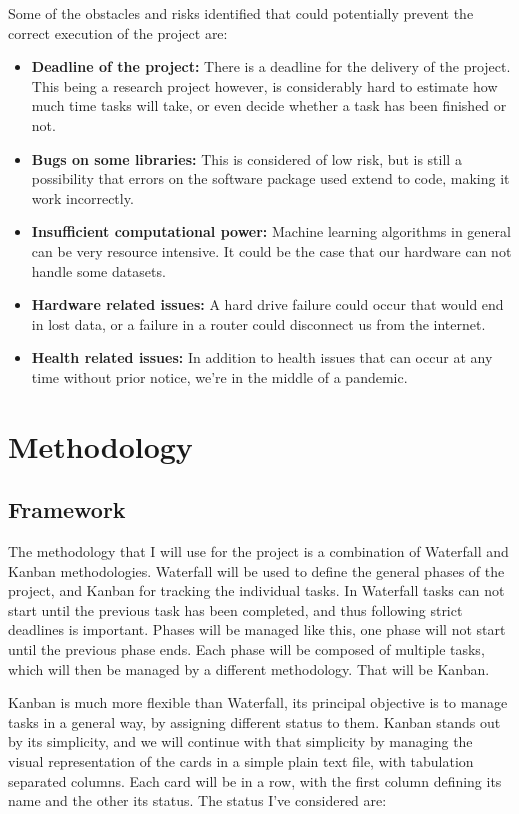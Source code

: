 Some of the obstacles and risks identified that could potentially prevent the correct execution of the project are:

\begin{itemize}
    \item \textbf{Deadline of the project:} There is a deadline for the delivery of the project. This being a research project however, is considerably hard to estimate how much time tasks will take, or even decide whether a task has been finished or not.
    \item \textbf{Bugs on some libraries:} This is considered of low risk, but is still a possibility that errors on the software package used extend to code, making it work in\-correctly.
    \item \textbf{Insufficient computational power:} Machine learning algorithms in general can be very resource intensive. It could be the case that our hardware can not handle some datasets. 
    \item \textbf{Hardware related issues:} A hard drive failure could occur that would end in lost data, or a failure in a router could disconnect us from the internet.
    \item \textbf{Health related issues:} In addition to health issues that can occur at any time without prior notice, we're in the middle of a pandemic.
\end{itemize}


\section{Methodology}

\subsection{Framework}

The methodology that I will use for the project is a combination of Waterfall and Kanban methodologies. Waterfall will be used to define the general phases of the project, and Kanban for tracking the individual tasks. In Waterfall tasks can not start until the previous task has been completed, and thus following strict deadlines is important. Phases will be managed like this, one phase will not start until the previous phase ends. Each phase will be composed of multiple tasks, which will then be managed by a different methodology. That will be Kanban.

Kanban is much more flexible than Waterfall, its principal objective is to manage tasks in a general way, by assigning different status to them. Kanban stands out by its simplicity, and we will continue with that simplicity by managing the visual representation of the cards in a simple plain text file, with tabulation separated columns. Each card will be in a row, with the first column defining its name and the other its status. The status I've considered are:

